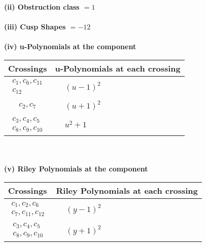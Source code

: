 \documentclass[1p]{elsarticle_modified}
\theoremstyle{definition}
\begin{document}
\flushleft \textbf{(ii) Obstruction class $= 1$}\\~\\
\flushleft \textbf{(iii) Cusp Shapes $= -12$}\\~\\
\newpage\renewcommand{\arraystretch}{1}
\flushleft \textbf{(iv) u-Polynomials at the component}\newline \\
\begin{tabular}{m{50pt}|m{274pt}}
Crossings & \hspace{64pt}u-Polynomials at each crossing \\
\hline $$\begin{aligned}c_{1},c_{6},c_{11}\\c_{12}\end{aligned}$$&$\begin{aligned}
&(u-1)^2
\end{aligned}$\\
\hline $$\begin{aligned}c_{2},c_{7}\end{aligned}$$&$\begin{aligned}
&(u+1)^2
\end{aligned}$\\
\hline $$\begin{aligned}c_{3},c_{4},c_{5}\\c_{8},c_{9},c_{10}\end{aligned}$$&$\begin{aligned}
&u^2+1
\end{aligned}$\\
\hline
\end{tabular}\\~\\
\newpage\renewcommand{\arraystretch}{1}
\flushleft \textbf{(v) Riley Polynomials at the component}\newline \\
\begin{tabular}{m{50pt}|m{274pt}}
Crossings & \hspace{64pt}Riley Polynomials at each crossing \\
\hline $$\begin{aligned}c_{1},c_{2},c_{6}\\c_{7},c_{11},c_{12}\end{aligned}$$&$\begin{aligned}
&(y-1)^2
\end{aligned}$\\
\hline $$\begin{aligned}c_{3},c_{4},c_{5}\\c_{8},c_{9},c_{10}\end{aligned}$$&$\begin{aligned}
&(y+1)^2
\end{aligned}$\\
\hline
\end{tabular}\\~\\
\end{document}

